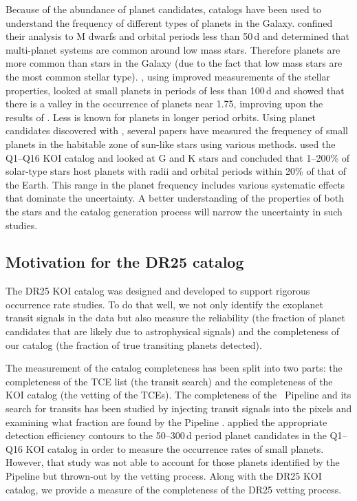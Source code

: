 Because of the abundance of planet candidates, \Kepler{} catalogs have been used to understand the frequency of different types of planets in the Galaxy. \citet{Dressing2013,Dressing2015} confined their analysis to M dwarfs and orbital periods less than 50\,d and determined that multi-planet systems are common around low mass stars.  Therefore planets are more common than stars in the Galaxy (due to the fact that low mass stars are the most common stellar type). \citet{Fulton2017}, using improved measurements of the stellar properties, looked at small planets in periods of less than 100\,d and showed that there is a valley in the occurrence of planets near 1.75\re{}, improving upon the results of \citep{Howard2012,Lundkvist2016} . Less is known for planets in longer period orbits. Using planet candidates discovered with \Kepler{}, several papers have measured the frequency of small planets in the habitable zone of sun-like stars \citep[see e.g.][]{ForemanMackey16, Petigura2013b, Burke2015} using various methods. \citet{Burke2015} used the Q1--Q16  KOI catalog \citep{Mullally2015cat} and looked at G and K stars and concluded that 1--200\% of solar-type stars host planets with radii and orbital periods within 20\% of that of the Earth. This range in the planet frequency includes various systematic effects that dominate the uncertainty. A better understanding of the properties of both the stars and the catalog generation process will narrow the uncertainty in such studies. 

 

\subsection{Motivation for the DR25 catalog}

The DR25 KOI catalog was designed and developed to support rigorous occurrence rate studies. To do that well, we not only identify the exoplanet transit signals in the data but also measure the reliability (the fraction of planet candidates that are likely due to astrophysical signals) and the completeness of our catalog (the fraction of true transiting planets detected).

The measurement of the catalog completeness has been split into two parts: the completeness of the TCE list (the transit search) and the completeness of the KOI catalog (the vetting of the TCEs). The completeness of the \Kepler\ Pipeline and its search for transits has been studied by injecting transit signals into the pixels and examining what fraction are found by the Pipeline \citep{Christiansen2017, Christiansen2015b,Christiansen2013a}. \citet{Burke2015} applied the appropriate detection efficiency contours \citep{Christiansen2015} to the 50--300\,d period planet candidates in the Q1--Q16 KOI catalog \citep{Mullally2015cat} in order to measure the occurrence rates of small planets. However, that study was not able to account for those planets identified by the \Kepler{} Pipeline but thrown-out by the vetting process. Along with the DR25 KOI catalog, we provide a measure of the completeness of the DR25 vetting process. 

